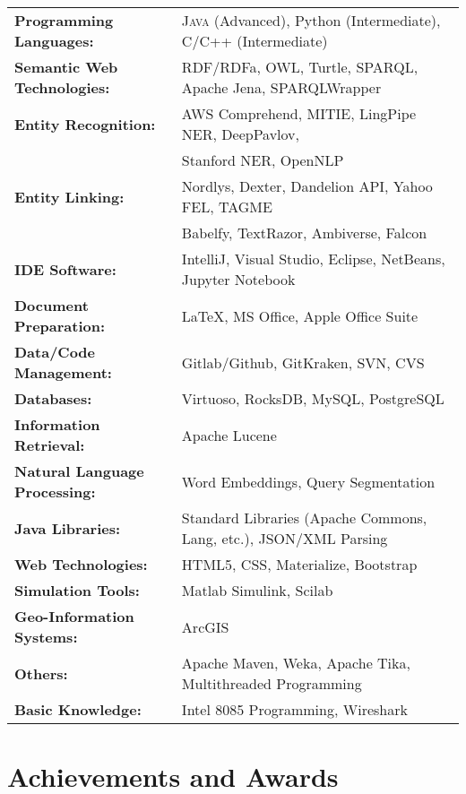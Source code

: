 \documentclass[a4paper,10pt]{article} %
\begin{document}
\begin{tabular}{ll}
\textbf{Programming Languages:} & \textsc{Java} (Advanced), Python (Intermediate), \textsc{C/C++} (Intermediate)\\
\textbf{Semantic Web Technologies:} & RDF/RDFa, \textsc{OWL}, Turtle, \textsc{SPARQL}, Apache Jena, SPARQLWrapper\\
\textbf{Entity Recognition:} & AWS Comprehend, \textsc{MITIE}, LingPipe NER, DeepPavlov, \\
							 & Stanford NER, OpenNLP\\
\textbf{Entity Linking:} & Nordlys, Dexter, Dandelion API, Yahoo FEL, \textsc{TAGME}\\
					     & Babelfy, TextRazor, Ambiverse, Falcon\\
\textbf{IDE Software:} & IntelliJ, Visual Studio, Eclipse, NetBeans, Jupyter Notebook\\
\textbf{Document Preparation:} & LaTeX, MS Office, Apple Office Suite\\
\textbf{Data/Code Management:} & Gitlab/Github, GitKraken, \textsc{SVN}, \textsc{CVS}\\
\textbf{Databases:} & Virtuoso, RocksDB, My\textsc{SQL}, Postgre\textsc{SQL}\\
\textbf{Information Retrieval:} & Apache Lucene\\
\textbf{Natural Language Processing:} & Word Embeddings, Query Segmentation\\
\textbf{Java Libraries:} & Standard Libraries (Apache Commons, Lang, etc.), JSON/XML Parsing\\
\textbf{Web Technologies:} & HTML5, CSS, Materialize, Bootstrap\\
\textbf{Simulation Tools:} & Matlab Simulink, Scilab\\
\textbf{Geo-Information Systems:} & ArcGIS\\
\textbf{Others:} & Apache Maven, Weka, Apache Tika, Multithreaded Programming\\
\textbf{Basic Knowledge:} & Intel 8085 Programming, Wireshark\\
\end{tabular}


\section{Achievements and Awards}
\end{document}
